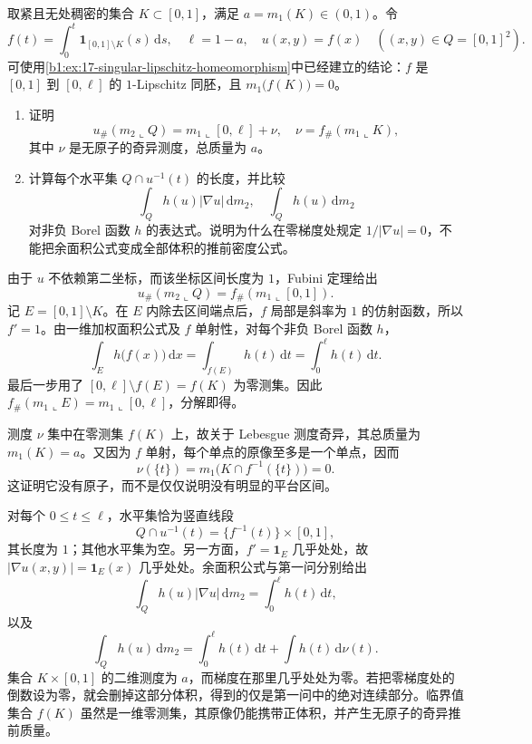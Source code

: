 \begin{exercise}\label{b1:ex:18-critical-singular-continuous-pushforward}
取紧且无处稠密的集合 \(K\subset[0,1]\)，满足 \(a=m_1(K)\in(0,1)\)。令
\[
 f(t)=\int_0^t\mathbf1_{[0,1]\setminus K}(s)\,\mathrm ds,
 \quad \ell=1-a,
 \quad u(x,y)=f(x)\quad((x,y)\in Q=[0,1]^2).
\]
可使用\cref{b1:ex:17-singular-lipschitz-homeomorphism}中已经建立的结论：\(f\) 是 \([0,1]\) 到 \([0,\ell]\) 的 \(1\)-Lipschitz 同胚，且 \(m_1\bigl(f(K)\bigr)=0\)。
\begin{enumerate}
\item\label{b1:item:18-critical-measure-decomposition}
证明
\[
 u_\#(m_2\llcorner Q)=m_1\llcorner[0,\ell]+\nu,
 \quad \nu=f_\#(m_1\llcorner K),
\]
其中 \(\nu\) 是无原子的奇异测度，总质量为 \(a\)。
\item\label{b1:item:18-critical-coarea-comparison}
计算每个水平集 \(Q\cap u^{-1}(t)\) 的长度，并比较
\[
 \int_Qh(u)|\nabla u|\,\mathrm dm_2,
 \quad \int_Qh(u)\,\mathrm dm_2
\]
对非负 Borel 函数 \(h\) 的表达式。说明为什么在零梯度处规定 \(1/|\nabla u|=0\)，不能把余面积公式变成全部体积的推前密度公式。
\end{enumerate}
\end{exercise}
\begin{solution}
由于 \(u\) 不依赖第二坐标，而该坐标区间长度为 \(1\)，Fubini 定理给出
\[
 u_\#(m_2\llcorner Q)=f_\#(m_1\llcorner[0,1]).
\]
记 \(E=[0,1]\setminus K\)。在 \(E\) 内除去区间端点后，\(f\) 局部是斜率为 \(1\) 的仿射函数，所以 \(f'=1\)。由一维加权面积公式及 \(f\) 单射性，对每个非负 Borel 函数 \(h\)，
\[
 \int_Eh\bigl(f(x)\bigr)\,\mathrm dx
 =\int_{f(E)}h(t)\,\mathrm dt
 =\int_0^\ell h(t)\,\mathrm dt.
\]
最后一步用了 \([0,\ell]\setminus f(E)=f(K)\) 为零测集。因此 \(f_\#(m_1\llcorner E)=m_1\llcorner[0,\ell]\)，分解即得。

测度 \(\nu\) 集中在零测集 \(f(K)\) 上，故关于 Lebesgue 测度奇异，其总质量为 \(m_1(K)=a\)。又因为 \(f\) 单射，每个单点的原像至多是一个单点，因而
\[
 \nu(\{t\})=m_1\bigl(K\cap f^{-1}(\{t\})\bigr)=0.
\]
这证明它没有原子，而不是仅仅说明没有明显的平台区间。

对每个 \(0\le t\le\ell\)，水平集恰为竖直线段
\[
 Q\cap u^{-1}(t)=\{f^{-1}(t)\}\times[0,1],
\]
其长度为 \(1\)；其他水平集为空。另一方面，\(f'=\mathbf1_E\) 几乎处处，故 \(|\nabla u(x,y)|=\mathbf1_E(x)\) 几乎处处。余面积公式与第一问分别给出
\[
 \int_Qh(u)|\nabla u|\,\mathrm dm_2
 =\int_0^\ell h(t)\,\mathrm dt,
\]
以及
\[
 \int_Qh(u)\,\mathrm dm_2
 =\int_0^\ell h(t)\,\mathrm dt+\int h(t)\,\mathrm d\nu(t).
\]
集合 \(K\times[0,1]\) 的二维测度为 \(a\)，而梯度在那里几乎处处为零。若把零梯度处的倒数设为零，就会删掉这部分体积，得到的仅是第一问中的绝对连续部分。临界值集合 \(f(K)\) 虽然是一维零测集，其原像仍能携带正体积，并产生无原子的奇异推前质量。
\end{solution}

